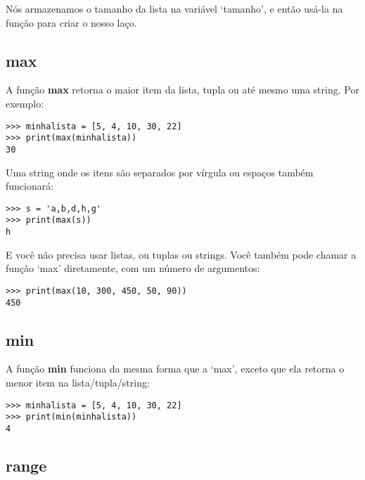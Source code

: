 \noindent
Nós armazenamos o tamanho da lista na variável `tamanho', e então usá-la na função  para criar o nosso laço.

\subsection*{max}

A função \textbf{max} retorna o maior item da lista, tupla ou até mesmo uma string. Por exemplo:

\begin{listing}
\begin{verbatim}
>>> minhalista = [5, 4, 10, 30, 22]
>>> print(max(minhalista))
30
\end{verbatim}
\end{listing}

\noindent
Uma string onde os itens são separados por vírgula ou espaços também funcionará:

\begin{listing}
\begin{verbatim}
>>> s = 'a,b,d,h,g'
>>> print(max(s))
h
\end{verbatim}
\end{listing}

\noindent
E você não precisa usar listas, ou tuplas ou strings. Você também pode chamar a função `max' diretamente, com um número de argumentos:

\begin{listing}
\begin{verbatim}
>>> print(max(10, 300, 450, 50, 90))
450
\end{verbatim}
\end{listing}

\subsection*{min}

A função \textbf{min} funciona da mesma forma que a `max', exceto que ela retorna o menor item na lista/tupla/string:

\begin{listing}
\begin{verbatim}
>>> minhalista = [5, 4, 10, 30, 22]
>>> print(min(minhalista))
4
\end{verbatim}
\end{listing}

\subsection*{range}

